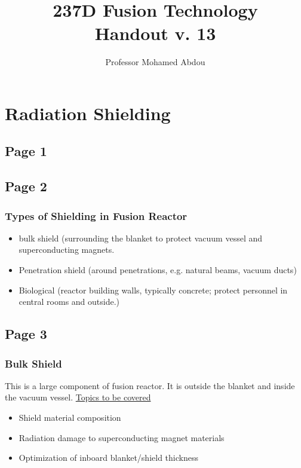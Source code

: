 \documentclass[11pt]{report} %
\title{237D Fusion Technology \\
Handout v. 13}
\author{Professor Mohamed Abdou}
\begin{document}
\maketitle
\chapter{Radiation Shielding}
\section{Page 1}
\section{Page 2}
\subsection{Types of Shielding in Fusion Reactor}

\begin{itemize}
\item bulk shield (surrounding the blanket to protect vacuum vessel and superconducting magnets.
\item Penetration shield (around penetrations, e.g. natural beams, vacuum ducts)
\item Biological (reactor building walls, typically concrete; protect personnel in central rooms and outside.)
\end{itemize}

\section{Page 3}
\subsection{Bulk Shield}
This is a large component of fusion reactor. It is outside the blanket and inside the vacuum vessel.
\underline{Topics to be covered}
\begin{itemize}
\item Shield material composition
\item Radiation damage to superconducting magnet materials
\item Optimization of inboard blanket/shield thickness
\end{itemize}
\end{document}
